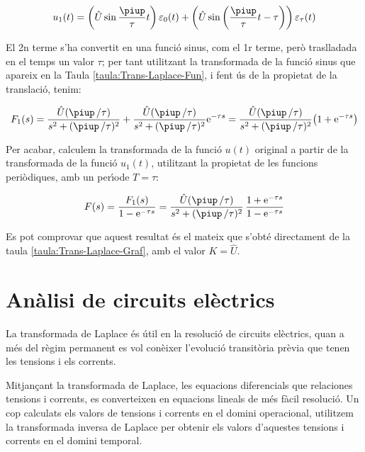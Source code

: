 \begin{exemple}
    \[
        u_1(t) = \left(\hat{U}\sin\frac{\piup}{\tau}t\right)\varepsilon_0(t) +
        \left(\hat{U}\sin\left(\frac{\piup}{\tau}t-\tau\right)\right)\varepsilon_\tau(t)
    \]

    El 2n terme s'ha convertit en una funci\'{o} sinus, com el 1r terme,
    per\`{o} traslladada en el temps un valor $\tau$; per tant utilitzant la
    transformada de la funci\'{o} sinus que apareix en la Taula
    \vref{taula:Trans-Laplace-Fun}, i fent \'{u}s de la propietat de la
    translaci\'{o}, tenim:

    \[
        F_1(s) = \frac{\hat{U} (\piup\,/\tau)}{s^2 + (\piup\,/\tau)^2} +
        \frac{\hat{U} (\piup\,/\tau)}{s^2 + (\piup\,/\tau)^2} \eu^{-\tau s} =
        \frac{\hat{U} (\piup\,/\tau)}{s^2 + (\piup\,/\tau)^2} \bigl( 1+\eu^{-\tau s}
        \big)
    \]

    Per acabar, calculem la transformada de la funci\'{o} $u(t)$ original a
    partir de la transformada de la funci\'{o} $u_1(t)$, utilitzant la
    propietat de les funcions peri\`{o}diques, amb un per\'{\i}ode $T=\tau$:

    \[
        F(s) = \frac{F_1(s)}{1-\eu^{-\tau s}} =
        \frac{\hat{U} (\piup\,/\tau) }{s^2 + (\piup\,/\tau)^2}\,\frac{1+\eu^{-\tau s}}{1-\eu^{-\tau
        s}}
    \]

    Es pot comprovar que aquest resultat \'{e}s el mateix que s'obt\'{e} directament de la taula \vref{taula:Trans-Laplace-Graf}, amb el valor $K=\hat{U}$.
\end{exemple}

\section{An\`{a}lisi de circuits el\`{e}ctrics}

La transformada de Laplace \'{e}s \'{u}til en la resoluci\'{o} de circuits
el\`{e}ctrics, quan a m\'{e}s del r\`{e}gim permanent es vol con\`{e}ixer
l'evoluci\'{o} transit\`{o}ria pr\`{e}via que tenen les tensions i els corrents.

Mitjan\c{c}ant la transformada de Laplace, les equacions diferencials
que relaciones tensions i corrents, es converteixen en equacions
lineals de m\'{e}s f\`{a}cil resoluci\'{o}. Un cop calculats els valors de
tensions i corrents en el domini operacional, utilitzem la
transformada inversa de Laplace per obtenir els valors d'aquestes
tensions i corrents en el domini temporal.

